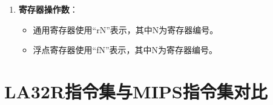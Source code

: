 \begin{enumerate}
  \begin{itemize}
  \tightlist
  \item
    当源操作数和目的操作数的数据位宽和有无符号情况一致时，指令名只有一个后缀。
  \item
    如果源操作数数据位宽和有无符号情况一致，但与目的操作数不一致，指令名有两个后缀，第一个后缀表示目的操作数，第二个后缀表示源操作数。
  \item
    若源操作和目的操作数情况更复杂，指令名将按顺序列出目的操作数和每个源操作数的情况。
  \end{itemize}

  例如：

  \begin{itemize}
  \tightlist
  \item
    指令``MULW.D.WU rd, rj, rk''中：

    \begin{itemize}
    \tightlist
    \item
      \texttt{.D}对应目的操作数\texttt{rd}
    \item
      \texttt{.WU}对应源操作数\texttt{rj}和\texttt{rk}
    \item
      表示该乘法指令将两个无符号字相乘，结果是双字，写入\texttt{rd}中。
    \end{itemize}
  \item
    指令``CRC.W.B.W rd, rj, rk''中：

    \begin{itemize}
    \tightlist
    \item
      第一个\texttt{.W}对应\texttt{rd}
    \item
      \texttt{.B}对应\texttt{rj}
    \item
      第二个\texttt{.W}对应\texttt{rk}
    \item
      表示该CRC校验指令将\texttt{rj}中的字节消息与\texttt{rk}中的32位原校验值生成新的32位校验值，结果写入\texttt{rd}中。
    \end{itemize}
  \end{itemize}
\item
  \textbf{寄存器操作数}：

  \begin{itemize}
  \tightlist
  \item
    通用寄存器使用``rN''表示，其中N为寄存器编号。
  \item
    浮点寄存器使用``fN''表示，其中N为寄存器编号。
  \end{itemize}
\end{enumerate}

\section{LA32R指令集与MIPS指令集对比}\label{sec:04-toolchain-006}

